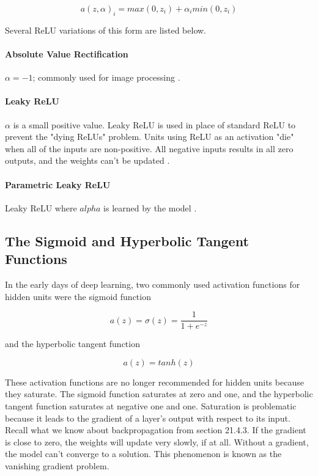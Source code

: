 \documentclass{article}
\begin{document}
\begin{equation}
    a(z,\alpha)_i = max(0, z_i) + \alpha_i min(0,z_i)
    \label{generalization-ReLU}
\end{equation}

Several ReLU variations of this form are listed below.

\paragraph{Absolute Value Rectification}\(\alpha = -1\); commonly used for image processing \cite{Goodfellow-et-al-2016}.

\paragraph{Leaky ReLU}\(\alpha\) is a small positive value. Leaky ReLU is used in place of standard ReLU to prevent the "dying ReLUs" problem. Units using ReLU as an activation "die" when all of the inputs are non-positive. All negative inputs results in all zero outputs, and the weights can't be updated \cite{hands-on-ml}.

\paragraph{Parametric Leaky ReLU}Leaky ReLU where \(alpha\) is learned by the model \cite{hands-on-ml}.

\subsection{The Sigmoid and Hyperbolic Tangent Functions}

In the early days of deep learning, two commonly used activation functions for hidden units were the sigmoid function

\begin{equation}
    a(z) = \sigma (z) = \frac{1}{1 + e^{-z}}
    \label{sigmoid-activation}
\end{equation}

and the hyperbolic tangent function

\begin{equation}
    a(z) = tanh(z)
    \label{tanh-activation}
\end{equation}

These activation functions are no longer recommended for hidden units because they saturate. The sigmoid function saturates at zero and one, and the hyperbolic tangent function saturates at  negative one and one. Saturation is problematic because it leads to the gradient of a layer's output with respect to its input. Recall what we know about backpropagation from section 21.4.3. If the gradient is close to zero, the weights will update very slowly, if at all. Without a gradient, the model can't converge to a solution. This phenomenon is known as the vanishing gradient problem.
\end{document}
